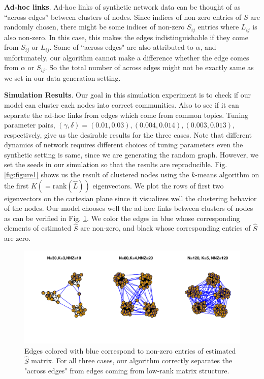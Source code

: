 \documentclass[AMS,STIX1COL]{WileyNJD-v2}
\begin{document}
\textbf{Ad-hoc links}.
Ad-hoc links of synthetic network data can be thought of as ``across edges'' between clusters of nodes.
Since indices of non-zero entries of $S$ are randomly chosen, there might be some indices of non-zero $S_{ij}$ entries where $L_{ij}$ is also non-zero.
In this case, this makes the edges indistinguishable if they come from $S_{ij}$ or $L_{ij}$.
Some of ``across edges" are also attributed to $\alpha$, and unfortunately, our algorithm cannot make a difference whether the edge comes from $\alpha$ or $S_{ij}$.
So the total number of across edges might not be exactly same as we set in our data generation setting.

\textbf{Simulation Results}.
Our goal in this simulation experiment is to check if our model can cluster each nodes into correct communities.
Also to see if it can separate the ad-hoc links from edges which come from common topics.
Tuning parameter pairs, $(\gamma,\delta) = (0.01,0.03),(0.004,0.014),(0.003,0.013)$, respectively, give us the desirable results for the three cases.
Note that different dynamics of network requires different choices of tuning parameters even the synthetic setting is same, since we are generating the random graph.
However, we set the seeds in our simulation so that the results are reproducible.
Fig. \ref{fig:figure1} shows us the result of clustered nodes using the $k$-means algorithm on the first $K(=\mbox{rank}(\widehat{L}))$ eigenvectors.
We plot the rows of first two eigenvectors on the cartesian plane since it visualizes well the clustering behavior of the nodes.
Our model chooses well the ad-hoc links between clusters of nodes as can be verified in Fig. \ref{fig:figure2}.
We color the edges in blue whose corresponding elements of estimated $\widehat{S}$ are non-zero, and black whose corresponding entries of $\widehat{S}$ are zero.

\begin{figure}[htbp]
\begin{center}
\includegraphics[scale=0.75]{Fig2.pdf}
\caption{Edges colored with blue correspond to non-zero entries of estimated $\widehat{S}$ matrix.
For all three cases, our algorithm correctly separates the "across edges" from edges coming from low-rank matrix structure.}
\label{fig:figure2}
\end{center}
\end{figure}
\end{document}
